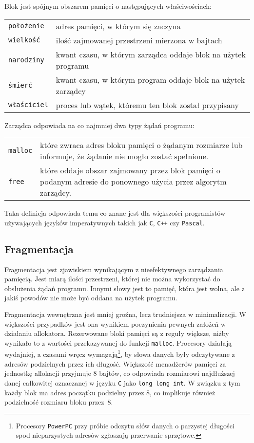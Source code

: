 \documentclass[12pt,a4paper,titlepage,twoside]{mwart}
\begin{document}
Blok jest spójnym obszarem pamięci o następujących właściwościach:

\begin{tabularx}{\textwidth}{@{\hspace{4ex}}lX@{}}
	\texttt{położenie}	& adres pamięci, w którym się zaczyna \\
	\texttt{wielkość}	& ilość zajmowanej przestrzeni mierzona w bajtach \\
	\texttt{narodziny}	& kwant czasu, w którym zarządca oddaje blok na użytek programu \\
	\texttt{śmierć}		& kwant czasu, w którym program oddaje blok na użytek zarządcy \\
	\texttt{właściciel}	& proces lub wątek, któremu ten blok został przypisany \\
\end{tabularx}

Zarządca odpowiada na co najmniej dwa typy żądań programu:

\begin{tabularx}{\textwidth}{@{\hspace{4ex}}lX@{}}
	\texttt{malloc} & które zwraca adres bloku pamięci o żądanym
	rozmiarze lub informuje, że żądanie nie mogło zostać spełnione. \\

	\texttt{free} & które oddaje obszar zajmowany przez blok pamięci o
	podanym adresie do ponownego użycia przez algorytm zarządcy. \\
\end{tabularx}

Taka definicja odpowiada temu co znane jest dla większości programistów
używających języków imperatywnych takich jak \verb#C#, \verb#C++# czy
\verb#Pascal#.

\subsection{Fragmentacja}

Fragmentacja jest zjawiskiem wynikającym z nieefektywnego zarządzania pamięcią.
Jest miarą ilości przestrzeni, której nie można wykorzystać do obsłużenia żądań
programu. Innymi słowy jest to pamięć, która jest wolna, ale z jakiś powodów
nie może być oddana na użytek programu.

Fragmentacja wewnętrzna jest mniej groźna, lecz trudniejsza w minimalizacji. W
większości przypadków jest ona wynikiem poczynienia pewnych założeń w działaniu
allokatora. Rezerwowane bloki pamięci są z reguły większe, niżby wynikało to z
wartości przekazywanej do funkcji \texttt{malloc}. Procesory działają
wydajniej, a czasami wręcz wymagają\footnote{Procesory \texttt{PowerPC} przy
próbie odczytu słów danych o parzystej długości spod nieparzystych adresów
zgłaszają przerwanie sprzętowe.}, by słowa danych były odczytywane z adresów
podzielnych przez ich długość. Większość menadżerów pamięci za jednostkę
allokacji przyjmuje $8$ bajtów, co odpowiada rozmiarowi najdłuższej danej
całkowitej oznaczanej w języku \verb+C+ jako \verb+long long int+. W związku z
tym każdy blok ma adres początku podzielny przez $8$, co implikuje również 
podzielność rozmiaru bloku przez~$8$.
\end{document}
